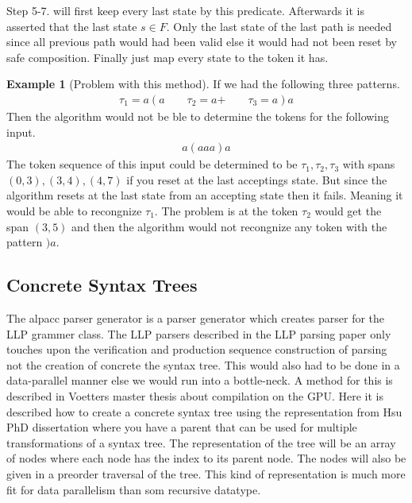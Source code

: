 \documentclass[a4paper,12pt]{article}
\theoremstyle{definition}
\newtheorem{example}{Example}[section]
\begin{document}
Step 5-7. will first keep every last state by this predicate. Afterwards it is asserted that the last state $s \in F$. Only the last state of the last path is needed since all previous path would had been valid else it would had not been reset by safe composition. Finally just map every state to the token it has.

\begin{example}[Problem with this method]
  If we had the following three patterns.
  \begin{align*}
    \tau_1 = a(a \qquad \tau_2 = a\text{+} \qquad \tau_3 = a)a
  \end{align*}
  Then the algorithm would not be ble to determine the tokens for the following input.
  \begin{align*}
    a(aaa)a
  \end{align*}
  The token sequence of this input could be determined to be $\tau_1, \tau_2, \tau_3$ with spans $(0, 3), (3, 4), (4, 7)$ if you reset at the last acceptings state. But since the algorithm resets at the last state from an accepting state then it fails. Meaning it would be able to recongnize $\tau_1$. The problem is at the token $\tau_2$ would get the span $(3, 5)$ and then the algorithm would not recongnize any token with the pattern $)a$.
\end{example}
\subsection{Concrete Syntax Trees}
The alpacc parser generator is a parser generator which creates parser for the LLP grammer class. The LLP parsers described in the LLP parsing paper \cite{Vagner2007} only touches upon the verification and production sequence construction of parsing not the creation of concrete the syntax tree. This would also had to be done in a data-parallel manner else we would run into a bottle-neck. A method for this is described in Voetters master thesis \cite[32-33]{voetter2021} about compilation on the GPU. Here it is described how to create a concrete syntax tree using the representation from Hsu PhD dissertation \cite[77-81]{hsu2019} where you have a parent that can be used for multiple transformations of a syntax tree. The representation of the tree will be an array of nodes where each node has the index to its parent node. The nodes will also be given in a preorder traversal of the tree. This kind of representation is much more fit for data parallelism than som recursive datatype.
\end{document}
